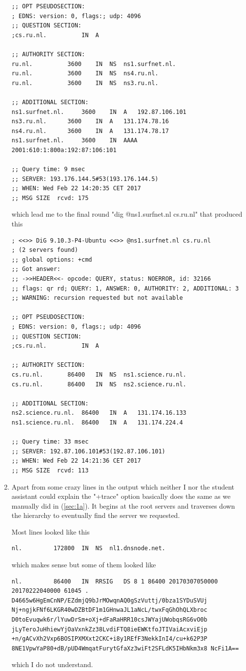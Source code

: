\documentclass[12pt, a4paper]{article}
\begin{document}
\begin{enumerate}[a]
\begin{lstlisting}
;; OPT PSEUDOSECTION:
; EDNS: version: 0, flags:; udp: 4096
;; QUESTION SECTION:
;cs.ru.nl.			IN	A

;; AUTHORITY SECTION:
ru.nl.			3600	IN	NS	ns1.surfnet.nl.
ru.nl.			3600	IN	NS	ns4.ru.nl.
ru.nl.			3600	IN	NS	ns3.ru.nl.

;; ADDITIONAL SECTION:
ns1.surfnet.nl.		3600	IN	A	192.87.106.101
ns3.ru.nl.		3600	IN	A	131.174.78.16
ns4.ru.nl.		3600	IN	A	131.174.78.17
ns1.surfnet.nl.		3600	IN	AAAA	2001:610:1:800a:192:87:106:101

;; Query time: 9 msec
;; SERVER: 193.176.144.5#53(193.176.144.5)
;; WHEN: Wed Feb 22 14:20:35 CET 2017
;; MSG SIZE  rcvd: 175
	\end{lstlisting}

	which lead me to the final round "dig @ns1.surfnet.nl cs.ru.nl" that produced this

	\begin{lstlisting}
; <<>> DiG 9.10.3-P4-Ubuntu <<>> @ns1.surfnet.nl cs.ru.nl
; (2 servers found)
;; global options: +cmd
;; Got answer:
;; ->>HEADER<<- opcode: QUERY, status: NOERROR, id: 32166
;; flags: qr rd; QUERY: 1, ANSWER: 0, AUTHORITY: 2, ADDITIONAL: 3
;; WARNING: recursion requested but not available

;; OPT PSEUDOSECTION:
; EDNS: version: 0, flags:; udp: 4096
;; QUESTION SECTION:
;cs.ru.nl.			IN	A

;; AUTHORITY SECTION:
cs.ru.nl.		86400	IN	NS	ns1.science.ru.nl.
cs.ru.nl.		86400	IN	NS	ns2.science.ru.nl.

;; ADDITIONAL SECTION:
ns2.science.ru.nl.	86400	IN	A	131.174.16.133
ns1.science.ru.nl.	86400	IN	A	131.174.224.4

;; Query time: 33 msec
;; SERVER: 192.87.106.101#53(192.87.106.101)
;; WHEN: Wed Feb 22 14:21:36 CET 2017
;; MSG SIZE  rcvd: 113
	\end{lstlisting}
	\label{sec:1a}

	\item %
	Apart from some crazy lines in the output which neither I nor the student assistant could explain the "+trace" option basically does the same as we manually did in (\ref{sec:1a}). It begins at the root servers and traverses down the hierarchy to eventually find the server we requested.

	Most lines looked like this
	\begin{lstlisting}
nl.			172800	IN	NS	nl1.dnsnode.net.
	\end{lstlisting}
	which makes sense but some of them looked like
	\begin{lstlisting}
nl.			86400	IN	RRSIG	DS 8 1 86400 20170307050000 20170222040000 61045 . D4665w6HgEmCnNP/EZdmjQ9bJrMOwqnAQ0gSzVuttj/0bza1SYDuSVUj Nj+ngjkFNf6LKGR40wDZBtDF1m1GHnwaJL1aNcL/twxFqGhOhQLXbroc D0toEvuqwk6r/lYuwDrSm+oXj+dFaRaHRR10csJWYajUWobqsRG6vO0b jLyTeroJuHhiewYjOaVxnkZz38LvdiFTQ8ieEWKtfoJTIVaiAcxviEjp +n/gACvXh2Vxp6BOSIPXMXxt2CKC+i8y1REfF3NekkInI4/cu+k62P3P 8NE1VpwYaP80+dB/pUD4WmqatFurytGfaXz3wiFt2SFLdK5IHbNkm3x8 NcFi1A==
	\end{lstlisting}
	which I do not understand.


\end{enumerate}
\end{document}
